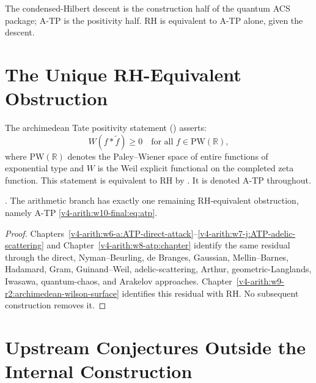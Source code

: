 \begin{remark}
\label{v4-arith:w10-final:rem:w10-a-shape}
The condensed-Hilbert descent is the construction half of the quantum
ACS package; A-TP is the positivity half. RH is equivalent to A-TP
alone, given the descent.
\end{remark}

\section{The Unique RH-Equivalent Obstruction}
\label{v4-arith:w10-final:tier1}

The archimedean Tate positivity statement
() asserts:
\begin{equation}
\label{v4-arith:w10-final:eq:atp}
W(f \ast \widetilde{f}) \geq 0 \quad \text{for all }
f \in \mathrm{PW}(\mathbb{R}),
\end{equation}
where \(\mathrm{PW}(\mathbb{R})\) denotes the Paley--Wiener space of
entire functions of exponential type and \(W\) is the Weil explicit
functional on the completed zeta function. This statement is
equivalent to RH by . It is
denoted A-TP throughout.

\begin{proposition}
\label{v4-arith:w10-final:prop:tier1}
\ClaimStatusProvedHere. The arithmetic branch has exactly one
remaining RH-equivalent obstruction, namely A-TP
\eqref{v4-arith:w10-final:eq:atp}.
\end{proposition}

\begin{proof}
Chapters~\ref{v4-arith:w6-a:ATP-direct-attack}--\ref{v4-arith:w7-j:ATP-adelic-scattering}
and Chapter~\ref{v4-arith:w8-atp:chapter} identify the same residual
through the direct, Nyman--Beurling, de Branges, Gaussian,
Mellin--Barnes, Hadamard, Gram, Guinand--Weil, adelic-scattering,
Arthur, geometric-Langlands, Iwasawa, quantum-chaos, and Arakelov
approaches. Chapter~\ref{v4-arith:w9-r2:archimedean-wilson-surface}
identifies this residual with RH. No subsequent construction removes
it.
\end{proof}

\section{Upstream Conjectures Outside the Internal Construction}
\label{v4-arith:w10-final:tier2}

